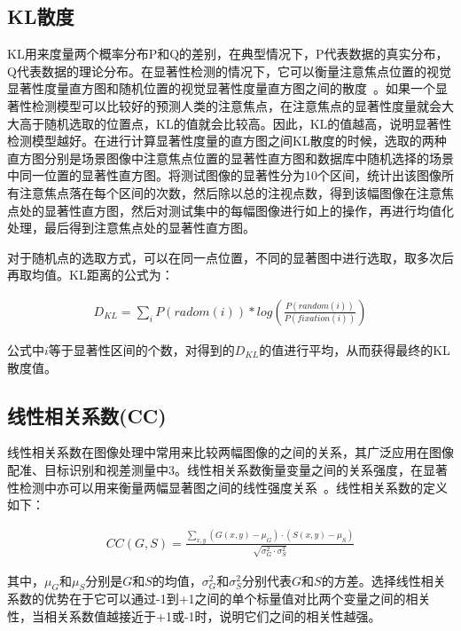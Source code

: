 \subsection{KL散度}
\label{2_5_3}

KL用来度量两个概率分布P和Q的差别，在典型情况下，P代表数据的真实分布，Q代表数据的理论分布。在显著性检测的情况下，它可以衡量注意焦点位置的视觉显著性度量直方图和随机位置的视觉显著性度量直方图之间的散度~\cite{Kullback1959book,IttiCVPR2005principled}。如果一个显著性检测模型可以比较好的预测人类的注意焦点，在注意焦点的显著性度量就会大大高于随机选取的位置点，KL的值就会比较高。因此，KL的值越高，说明显著性检测模型越好。在进行计算显著性度量的直方图之间KL散度的时候，选取的两种直方图分别是场景图像中注意焦点位置的显著性直方图和数据库中随机选择的场景中同一位置的显著性直方图。将测试图像的显著性分为10个区间，统计出该图像所有注意焦点落在每个区间的次数，然后除以总的注视点数，得到该幅图像在注意焦点处的显著性直方图，然后对测试集中的每幅图像进行如上的操作，再进行均值化处理，最后得到注意焦点处的显著性直方图。

对于随机点的选取方式，可以在同一点位置，不同的显著图中进行选取，取多次后再取均值。KL距离的公式为：
\begin{linenomath}
\begin{align}
D_{KL}=\sum_{i}P(radom(i))*log(\frac{P(random(i))}{P(fixation(i))})
\label{式2_42}
\end{align}
\end{linenomath}
公式中$i$等于显著性区间的个数，对得到的$D_{KL}$的值进行平均，从而获得最终的KL散度值。

\subsection{线性相关系数(CC)}
\label{2_5_4}

线性相关系数在图像处理中常用来比较两幅图像的之间的关系，其广泛应用在图像配准、目标识别和视差测量中3。线性相关系数衡量变量之间的关系强度，在显著性检测中亦可以用来衡量两幅显著图之间的线性强度关系~\cite{Jost2005Assessing}。线性相关系数的定义如下：
\begin{linenomath}
\begin{align}
CC(G,S)=\frac{\sum_{x,y}(G(x,y)-\mu_{G})\cdot(S(x,y)-\mu_{S})}{\sqrt{\sigma_{G}^{2}\cdot\sigma_{S}^{2}}}
\label{式2_43}
\end{align}
\end{linenomath}
其中，$\mu_{G}$和$\mu_{S}$分别是$G$和$S$的均值，$\sigma_{G}^{2}$和$\sigma_{S}^{2}$分别代表$G$和$S$的方差。选择线性相关系数的优势在于它可以通过-1到+1之间的单个标量值对比两个变量之间的相关性，当相关系数值越接近于+1或-1时，说明它们之间的相关性越强。

